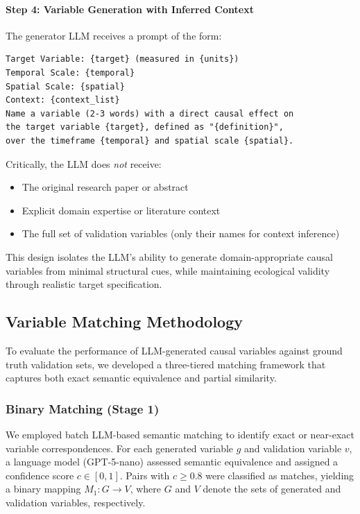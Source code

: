 \paragraph{Step 4: Variable Generation with Inferred Context}
The generator LLM receives a prompt of the form:
\begin{verbatim}
Target Variable: {target} (measured in {units})
Temporal Scale: {temporal}
Spatial Scale: {spatial}
Context: {context_list}
Name a variable (2-3 words) with a direct causal effect on 
the target variable {target}, defined as "{definition}",
over the timeframe {temporal} and spatial scale {spatial}.
\end{verbatim}

Critically, the LLM does \emph{not} receive:
\begin{itemize}
\item The original research paper or abstract
\item Explicit domain expertise or literature context
\item The full set of validation variables (only their names for context inference)
\end{itemize}

This design isolates the LLM's ability to generate domain-appropriate causal variables from minimal structural cues, while maintaining ecological validity through realistic target specification.


\subsection{Variable Matching Methodology}

To evaluate the performance of LLM-generated causal variables against ground truth validation sets, we developed a three-tiered matching framework that captures both exact semantic equivalence and partial similarity.

\subsubsection{Binary Matching (Stage 1)}

We employed batch LLM-based semantic matching to identify exact or near-exact variable correspondences. For each generated variable \(g\) and validation variable \(v\), a language model (GPT-5-nano) assessed semantic equivalence and assigned a confidence score \(c \in [0,1]\). Pairs with \(c \geq 0.8\) were classified as matches, yielding a binary mapping \(M_1 : G \to V\), where \(G\) and \(V\) denote the sets of generated and validation variables, respectively.


